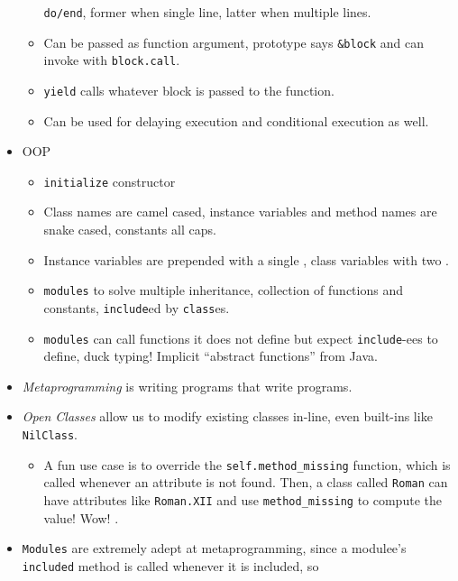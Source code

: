 \documentclass[10pt, twocolumn, landscape]{article}
\begin{document}
\begin{itemize}
\begin{itemize}
                \texttt{do/end}, former when single line, latter when multiple
                lines.
            \item Can be passed as function argument, prototype says
                \texttt{\&block} and can invoke with \texttt{block.call}.
            \item \texttt{yield} calls whatever block is passed to the function.
            \item Can be used for delaying execution and conditional execution
                as well.
        \end{itemize}
    \item OOP
        \begin{itemize}
            \item \texttt{initialize} constructor
            \item Class names are camel cased, instance variables and method
                names are snake cased, constants all caps.
            \item Instance variables are prepended with a single \texttt{\@},
                class variables with two \texttt{\@\@}.
            \item \texttt{modules} to solve multiple inheritance, collection of
                functions and constants, \texttt{include}ed by \texttt{class}es.
            \item \texttt{modules} can call functions it does not define but
                expect \texttt{include}-ees to define, duck typing! Implicit
                ``abstract functions'' from Java.
        \end{itemize}
    \item \emph{Metaprogramming} is writing programs that write programs.
    \item \emph{Open Classes} allow us to modify existing classes in-line, even
        built-ins like \texttt{NilClass}.
        \begin{itemize}
            \item A fun use case is to override the
                \texttt{self.method\_missing} function, which is called whenever
                an attribute is not found. Then, a class called \texttt{Roman}
                can have attributes like \texttt{Roman.XII} and use
                \texttt{method\_missing} to compute the value! Wow! \smiley.
        \end{itemize}
    \item \texttt{Modules} are extremely adept at metaprogramming, since a
        modulee's \texttt{included} method is called whenever it is included, so

\end{itemize}
\end{document}
